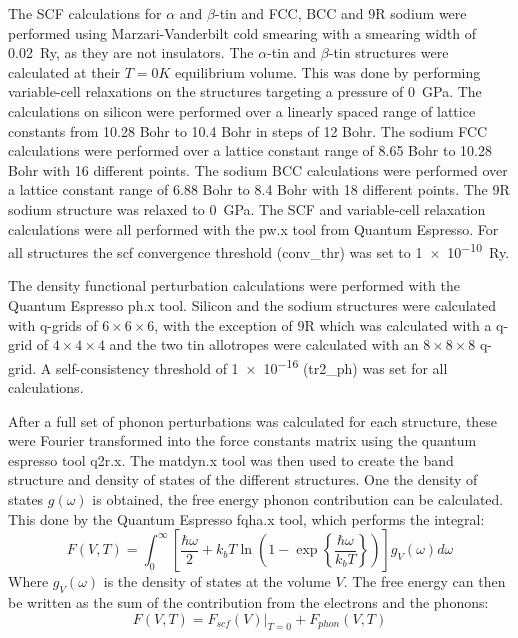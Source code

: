 \documentclass[12pt]{article}
\begin{document}
The SCF calculations for $\alpha$ and $\beta$-tin and FCC, BCC and 9R sodium were performed using Marzari-Vanderbilt cold smearing \cite{marzari1999thermal} with a smearing width of \SI{0.02}{Ry}, as they are not insulators. 
The $\alpha$-tin and $\beta$-tin structures were calculated at their $T=0K$ equilibrium volume. This was done by performing variable-cell relaxations on the structures targeting a pressure of \SI{0}{\giga\pascal}. 
The calculations on silicon were performed over a linearly spaced range of lattice constants from 10.28 Bohr to 10.4 Bohr in steps of 12 Bohr. 
The sodium FCC calculations were performed over a lattice constant range of 8.65 Bohr to 10.28 Bohr with 16 different points. The sodium BCC calculations were performed over a lattice constant range of 6.88 Bohr to 8.4 Bohr with 18 different points.
The 9R sodium structure was relaxed to \SI{0}{\giga\pascal}. The SCF and variable-cell relaxation calculations were all performed with the pw.x tool from Quantum Espresso. For all structures the scf convergence threshold (conv\_thr) was set to \SI{1e-10}{Ry}.

The density functional perturbation calculations were performed with the Quantum Espresso ph.x tool. Silicon and the sodium structures were calculated with q-grids of $6\times 6\times 6$, with the exception of 9R which was calculated with a q-grid of $4\times4\times4$ and the two tin allotropes were calculated with an $8\times8\times8$ q-grid. A self-consistency threshold of \num{1e-16} (tr2\_ph) was set for all calculations.

After a full set of phonon perturbations was calculated for each structure, these were Fourier transformed into the force constants matrix using the quantum espresso tool q2r.x. The matdyn.x tool was then used to create the band structure and density of states of the different structures. One the density of states $g(\omega)$ is obtained, the free energy phonon contribution can be calculated. This done by the Quantum Espresso fqha.x tool, which performs the integral:
\begin{equation}
	\label{eq:phononfreeenergy}
	F(V, T) = \int_0^\infty \left[\frac{\hbar\omega}{2} + k_bT \ln\left(1-\exp\left\{\frac{\hbar \omega}{k_bT}\right\} \right) \right]g_V(\omega) d\omega
\end{equation}
Where $g_V(\omega)$ is the density of states at the volume $V$. The free energy can then be written as the sum of the contribution from the electrons and the phonons: 
\begin{equation}\label{eq:total_free_energy}
F(V, T) = F_{scf}(V)|_{T=0} + F_{phon}(V, T)
\end{equation}
\end{document}
